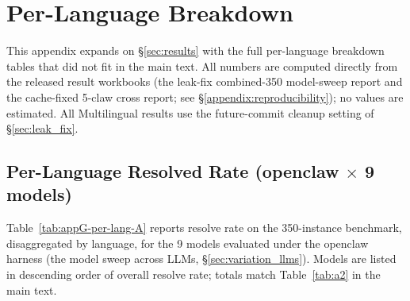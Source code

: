 \section{Per-Language Breakdown}\label{appendix:per-repo}

This appendix expands on \S\ref{sec:results} with the full per-language breakdown
tables that did not fit in the main text. All numbers are computed directly from
the released result workbooks (the leak-fix combined-350 model-sweep report and
the cache-fixed 5-claw cross report; see \S\ref{appendix:reproducibility}); no
values are estimated. All Multilingual results use the future-commit cleanup
setting of \S\ref{sec:leak_fix}.

\subsection{Per-Language Resolved Rate (openclaw $\times$ 9 models)}
\label{appendix:per-repo:g1}

Table~\ref{tab:appG-per-lang-A} reports resolve rate on the 350-instance benchmark,
disaggregated by language, for the 9 models evaluated under the openclaw harness
(the model sweep across LLMs, \S\ref{sec:variation_llms}). Models are listed in
descending order of overall resolve rate; totals match Table~\ref{tab:a2} in the
main text.


